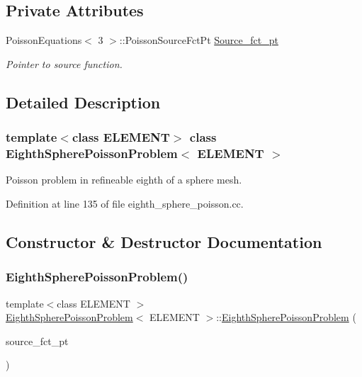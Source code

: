 \subsection*{Private Attributes}
\begin{DoxyCompactItemize}
\item 
Poisson\+Equations$<$ 3 $>$\+::Poisson\+Source\+Fct\+Pt \hyperlink{classEighthSpherePoissonProblem_af41ed0ce372d5932c64b3cd4fe69f312}{Source\+\_\+fct\+\_\+pt}
\begin{DoxyCompactList}\small\item\em Pointer to source function. \end{DoxyCompactList}\end{DoxyCompactItemize}


\subsection{Detailed Description}
\subsubsection*{template$<$class E\+L\+E\+M\+E\+NT$>$\newline
class Eighth\+Sphere\+Poisson\+Problem$<$ E\+L\+E\+M\+E\+N\+T $>$}

Poisson problem in refineable eighth of a sphere mesh. 

Definition at line 135 of file eighth\+\_\+sphere\+\_\+poisson.\+cc.



\subsection{Constructor \& Destructor Documentation}
\mbox{\label{classEighthSpherePoissonProblem_ae51db2c3e80f0d5628e4d81eb1c11db4}} 
\subsubsection{\texorpdfstring{Eighth\+Sphere\+Poisson\+Problem()}{EighthSpherePoissonProblem()}}
{\footnotesize\ttfamily template$<$class E\+L\+E\+M\+E\+NT $>$ \\
\hyperlink{classEighthSpherePoissonProblem}{Eighth\+Sphere\+Poisson\+Problem}$<$ E\+L\+E\+M\+E\+NT $>$\+::\hyperlink{classEighthSpherePoissonProblem}{Eighth\+Sphere\+Poisson\+Problem} (\begin{DoxyParamCaption}\item[{Poisson\+Equations$<$ 3 $>$\+::Poisson\+Source\+Fct\+Pt}]{source\+\_\+fct\+\_\+pt }\end{DoxyParamCaption})}



